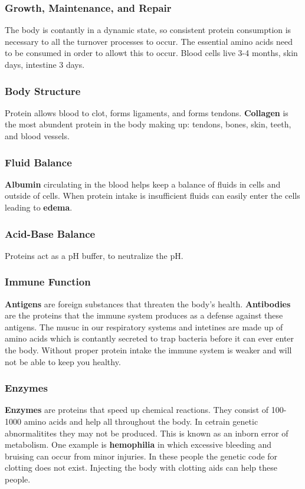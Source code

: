 \documentclass[letterpaper, 11pt]{article}
\begin{document}
\subsubsection{Growth, Maintenance, and Repair}
\label{sec:orgf7add25}
The body is contantly in a dynamic state, so consistent protein consumption is necessary to all the turnover processes to occur. The essential amino acids need to be consumed in order to allowt this to occur. Blood cells live 3-4 months, skin days, intestine 3 days.\\
\subsubsection{Body Structure}
\label{sec:org60dbce0}
Protein allows blood to clot, forms ligaments, and forms tendons. \textbf{Collagen} is the most abundent protein in the body making up: tendons, bones, skin, teeth, and blood vessels.\\
\subsubsection{Fluid Balance}
\label{sec:org196fe5c}
\textbf{Albumin} circulating in the blood helps keep a balance of fluids in cells and outside of cells. When protein intake is insufficient fluids can easily enter the cells leading to \textbf{edema}.\\
\subsubsection{Acid-Base Balance}
\label{sec:orgc39afc1}
Proteins act as a pH buffer, to neutralize the pH.\\
\subsubsection{Immune Function}
\label{sec:orgd736902}
\textbf{Antigens} are foreign substances that threaten the body's health. \textbf{Antibodies} are the proteins that the immune system produces as a defense against these antigens. The musuc in our respiratory systems and intetines are made up of amino acids which is contantly secreted to trap bacteria before it can ever enter the body. Without proper protein intake the immune system is weaker and will not be able to keep you healthy.\\
\subsubsection{Enzymes}
\label{sec:org39d0677}
\textbf{Enzymes} are proteins that speed up chemical reactions. They consist of 100-1000 amino acids and help all throughout the body. In cetrain genetic abnormalitites they may not be produced. This is known as an inborn error of metabolism. One example is \textbf{hemophilia} in which excessive bleeding and bruising can occur from minor injuries. In these people the genetic code for clotting does not exist. Injecting the body with clotting aids can help these people.\\
\end{document}
